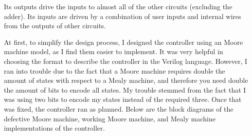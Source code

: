 \documentclass{article}
\begin{document}
Its outputs
drive the inputs to almost all of the other circuits
(excluding the adder). Its inputs are driven by a combination
of user inputs and internal wires from the outputs of other
circuits.

At first, to simplify the design process, I designed the
controller using an Moore machine model, as I find them
easier to implement. It was very helpful
in choosing the format to describe the controller in
the Verilog language.
However, I ran into trouble due to the fact that
a Moore machine requires double the amount of states
with respect to a Mealy machine, and therefore you need
double the amount of bits to encode all states. My trouble
stemmed from the fact that I was using two bits to encode
my states instead of the required three. Once that was fixed,
the controller ran as planned. Below are the block diagrams
of the defective Moore machine, working Moore machine, and
Mealy machine implementations of the controller.
\end{document}
